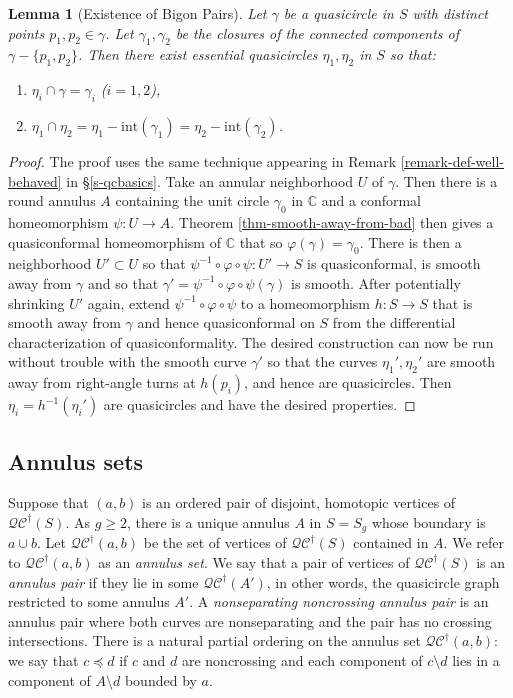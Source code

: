 \documentclass[12pt,a4paper]{amsart}
\newcommand{\bbC}{\mathbb C}
\theoremstyle{definition}
\theoremstyle{plain}
\newtheorem{lemma}[theorem]{Lemma}
\numberwithin{equation}{section}
\newcommand{\qcg}{\mathcal{QC}^{\dagger}}
\begin{document}
\begin{lemma}[Existence of Bigon Pairs]\label{Lem:ExistenceBigonPairs}
    Let $\gamma$ be a quasicircle in $S$ with distinct points $p_1, p_2 \in \gamma$. Let $\gamma_1, \gamma_2$ be the closures of the connected components of $\gamma - \{p_1, p_2\}$.
    Then there exist essential quasicircles $\eta_1, \eta_2$ in $S$ so that:
    \begin{enumerate}
        \item $\eta_i \cap \gamma = \gamma_i$ ($i = 1, 2$),
        \item $\eta_1 \cap \eta_2 = \eta_1 - \text{int}(\gamma_1) = \eta_2 - \text{int}(\gamma_2)$.
    \end{enumerate}
\end{lemma}

\begin{proof}
    The proof uses the same technique appearing in Remark \ref{remark-def-well-behaved} in \S\ref{s-qcbasics}. 
    Take an annular neighborhood $U$ of $\gamma$.
    Then there is a round annulus $A$ containing the unit circle $\gamma_0$ in $\bbC$ and a conformal homeomorphism $\psi : U  \to A$.
    Theorem \ref{thm-smooth-away-from-bad} then gives a quasiconformal homeomorphism of $\bbC$ that so $\varphi(\gamma) = \gamma_0$.
    There is then a neighborhood $U' \subset U$ so that $\psi^{-1} \circ \varphi \circ \psi : U' \to S$ is quasiconformal, is smooth away from $\gamma$ and so that $\gamma' = \psi^{-1} \circ \varphi \circ \psi(\gamma)$ is smooth.
    After potentially shrinking $U'$ again, extend $\psi^{-1} \circ \varphi \circ \psi$ to a homeomorphism $h : S \to S$ that is smooth away from $\gamma$ and hence quasiconformal on $S$ from the differential characterization of quasiconformality.
    The desired construction can now be run without trouble with the smooth curve $\gamma'$ so that the curves $\eta_1', \eta_2'$ are smooth away from right-angle turns at $h(p_i)$, and hence are quasicircles.
    Then $\eta_i = h^{-1}(\eta_i')$ are quasicircles and have the desired properties.
\end{proof} 

\subsection*{Annulus sets}
Suppose that $(a, b)$ is an ordered pair of disjoint, homotopic vertices of $\qcg(S)$.
As $g \geq 2$, there is a unique annulus $A$ in $S=S_g$ whose boundary is $a \cup b$. Let $\qcg(a, b)$ be
the set of vertices of $\qcg(S)$ contained in $A$. We refer to $\qcg(a, b)$ as an \textit{annulus set}. We say
that a pair of vertices of $\qcg(S)$ is an \textit{annulus pair} if they lie in some $\qcg(A')$, in other words, the quasicircle graph restricted to some annulus $A'$. 
A \textit{nonseparating 
noncrossing annulus pair} is an annulus pair where both curves are nonseparating and the
pair has no crossing intersections.
There is a natural partial ordering on the annulus set $\qcg(a,b)$: we say that $c \preceq d$ if $c$ and $d$ are
noncrossing and each component of $c \setminus d$ lies in a component of $A \setminus d$ bounded by $a$.
\end{document}
